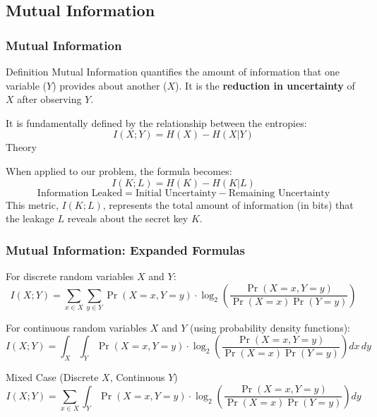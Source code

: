 \subsection{Mutual Information}
\begin{frame}
    \frametitle{Mutual Information}
    
    \begin{block}{Definition}
        Mutual Information quantifies the amount of information that one variable ($Y$) provides about another ($X$). It is the \textbf{reduction in uncertainty} of $X$ after observing $Y$.
        
        It is fundamentally defined by the relationship between the entropies:
        $$ I(X;Y) = H(X) - H(X|Y) $$Theory
    \end{block}
    
    When applied to our problem, the formula becomes:
    $$ I(K;L) = H(K) - H(K|L) $$
    $$ \text{Information Leaked} = \text{Initial Uncertainty} - \text{Remaining Uncertainty} $$
    This metric, $I(K;L)$, represents the total amount of information (in bits) that the leakage $L$ reveals about the secret key $K$.
 
\end{frame}

\begin{frame}
    \frametitle{Mutual Information: Expanded Formulas}

    For discrete random variables $X$ and $Y$:
    $$
    I(X; Y) = \sum_{x \in X} \sum_{y \in Y} \Pr(X = x, Y = y) \cdot \log_2 \left( \frac{ \Pr(X = x, Y = y) }{ \Pr(X = x)\Pr(Y = y) } \right)
    $$


    For continuous random variables $X$ and $Y$ (using probability density functions):
    $$
    I(X; Y) = \int_{X} \int_{Y} \Pr(X = x, Y = y) \cdot \log_2 \left( \frac{ \Pr(X = x, Y = y) }{ \Pr(X = x)\Pr(Y = y) } \right) dx\,dy
    $$

    Mixed Case (Discrete $X$, Continuous $Y$)
        $$
        I(X; Y) = \sum_{x \in X} \int_{Y} \Pr(X = x, Y = y) \cdot \log_2 \left( \frac{ \Pr(X = x, Y = y) }{ \Pr(X = x)\Pr(Y = y) } \right) dy
        $$
\end{frame}


